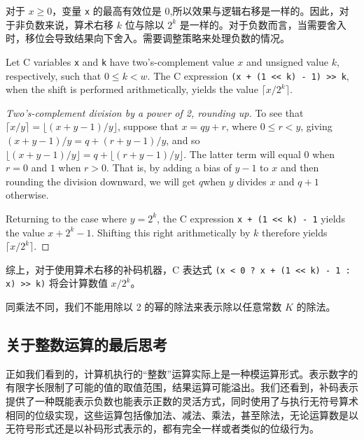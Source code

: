 对于 $x \geq 0$，变量 \verb|x| 的最高有效位是 0,所以效果与逻辑右移是一样的。因此，对于非负数来说，算术右移 $k$ 位与除以 $2^k$ 是一样的。对于负数而言，当需要舍入时，移位会导致结果向下舍入。需要调整策略来处理负数的情况。

\begin{theorem}
    Let C variables \verb|x| and \verb|k| have two’s-complement value $x$ and unsigned value $k$, respectively, such that $0 \leq k < w$. The C expression \verb|(x + (1 << k) - 1) >> k|, when the shift is performed arithmetically, yields the value $\lceil x / 2^k \rceil$.
\end{theorem}

\begin{proof}[Two's-complement division by a power of 2, rounding up]
    To see that $\lceil x / y \rceil = \lfloor (x + y − 1)/y \rfloor$, suppose that $x = qy + r$, where $0 \leq r < y$, giving $(x + y − 1) / y = q + (r + y − 1) / y$, and so $\lfloor (x + y − 1) / y \rfloor = q + \lfloor (r + y − 1) / y \rfloor$. The latter term will equal $0$ when $r = 0$ and $1$ when $r > 0$. That is, by adding a bias of $y − 1$ to $x$ and then rounding the division downward, we will get $q $when $y$ divides $x$ and $q + 1$ otherwise.

    Returning to the case where $y = 2^k$, the C expression \verb|x + (1 << k) - 1| yields the value $x + 2^k − 1$. Shifting this right arithmetically by $k$ therefore yields $\lceil x / 2^k \rceil$.
\end{proof}

综上，对于使用算术右移的补码机器，C 表达式 \verb|(x < 0 ? x + (1 << k) - 1 : x) >> k)| 将会计算数值 $x / 2^k$。

同乘法不同，我们不能用除以 2 的幂的除法来表示除以任意常数 $K$ 的除法。

\subsection{关于整数运算的最后思考}

正如我们看到的，计算机执行的“整数”运算实际上是一种模运算形式。表示数字的有限字长限制了可能的值的取值范围，结果运算可能溢出。我们还看到，补码表示提供了一种既能表示负数也能表示正数的灵活方式，同时使用了与执行无符号算术相同的位级实现，这些运算包括像加法、减法、乘法，甚至除法，无论运算数是以无符号形式还是以补码形式表示的，都有完全一样或者类似的位级行为。

\endinput
